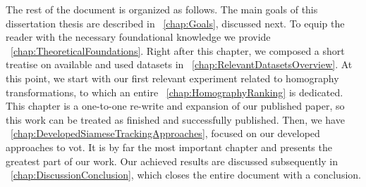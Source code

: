 The rest of the document is organized as follows. The main goals of this dissertation thesis are described in \chaptertext{}~\ref{chap:Goals}, discussed next. To equip the reader with the necessary foundational knowledge we provide \chaptertext{}~\ref{chap:TheoreticalFoundations}. Right after this chapter, we composed a short treatise on available and used datasets in \chaptertext{}~\ref{chap:RelevantDatasetsOverview}. At this point, we start with our first relevant experiment related to homography transformations, to which an entire \chaptertext{}~\ref{chap:HomographyRanking} is dedicated. This chapter is a one-to-one re-write and expansion of our published paper, so this work can be treated as finished and successfully published. Then, we have \chaptertext{}~\ref{chap:DevelopedSiameseTrackingApproaches}, focused on our developed approaches to \gls{vot}. It is by far the most important chapter and presents the greatest part of our work. Our achieved results are discussed subsequently in \chaptertext{}~\ref{chap:DiscussionConclusion}, which closes the entire document with a conclusion.